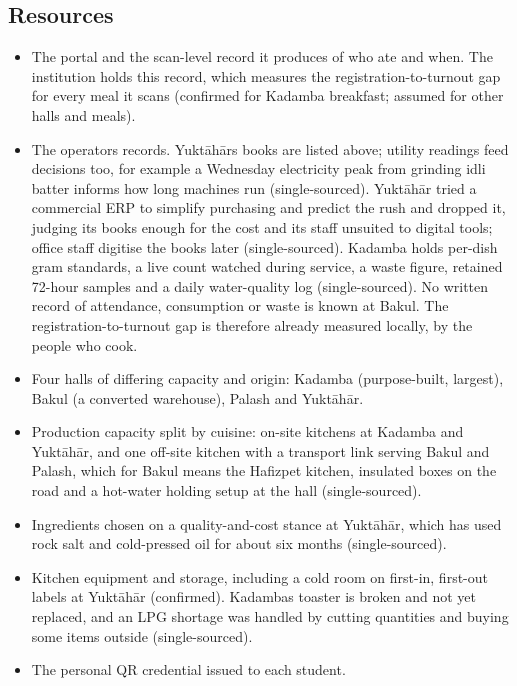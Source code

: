 \documentclass[
  10pt,
  table]{article}
\providecommand{\tightlist}{%
  \setlength{\itemsep}{0pt}\setlength{\parskip}{0pt}}
\renewcommand{\tightlist}{\setlength{\itemsep}{1.5pt}\setlength{\parskip}{0pt}}
\begin{document}
\subsection{Resources}\label{resources}

\begin{itemize}
\tightlist
\item
  The portal and the scan-level record it produces of who ate and when. The institution holds this record, which measures the registration-to-turnout gap for every meal it scans (confirmed for Kadamba breakfast; assumed for other halls and meals).
\item
  The operators\textquotesingle{} records. Yuktāhār\textquotesingle s books are listed above; utility readings feed decisions too, for example a Wednesday electricity peak from grinding idli batter informs how long machines run (single-sourced). Yuktāhār tried a commercial ERP to simplify purchasing and predict the rush and dropped it, judging its books enough for the cost and its staff unsuited to digital tools; office staff digitise the books later (single-sourced). Kadamba holds per-dish gram standards, a live count watched during service, a waste figure, retained 72-hour samples and a daily water-quality log (single-sourced). No written record of attendance, consumption or waste is known at Bakul. The registration-to-turnout gap is therefore already measured locally, by the people who cook.
\item
  Four halls of differing capacity and origin: Kadamba (purpose-built, largest), Bakul (a converted warehouse), Palash and Yuktāhār.
\item
  Production capacity split by cuisine: on-site kitchens at Kadamba and Yuktāhār, and one off-site kitchen with a transport link serving Bakul and Palash, which for Bakul means the Hafizpet kitchen, insulated boxes on the road and a hot-water holding setup at the hall (single-sourced).
\item
  Ingredients chosen on a quality-and-cost stance at Yuktāhār, which has used rock salt and cold-pressed oil for about six months (single-sourced).
\item
  Kitchen equipment and storage, including a cold room on first-in, first-out labels at Yuktāhār (confirmed). Kadamba\textquotesingle s toaster is broken and not yet replaced, and an LPG shortage was handled by cutting quantities and buying some items outside (single-sourced).
\item
  The personal QR credential issued to each student.
\end{itemize}
\end{document}
